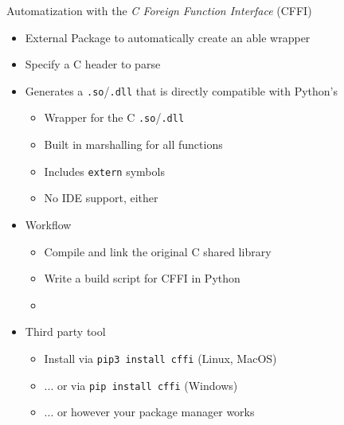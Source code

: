 
\begin{frame}{Automatization with the \emph{C Foreign Function Interface} (CFFI)}
%
\begin{itemize}
\item External Package to automatically create an able wrapper
\item Specify a C header to parse
\item Generates a \texttt{.so}/\texttt{.dll} that is directly compatible with Python's 
	\begin{itemize}
	\item Wrapper for the C \texttt{.so}/\texttt{.dll}
	\item Built in marshalling for all functions
	\item Includes \texttt{extern} symbols
	\item No IDE support, either
	\end{itemize}
\item Workflow
	\begin{itemize}
	\item Compile and link the original C shared library
	\item Write a build script for CFFI in Python
	\item {}
	\end{itemize}
\item Third party tool
	\begin{itemize}
	\item Install via \texttt{pip3 install cffi} (Linux, MacOS)
	\item ... or via \texttt{pip install cffi} (Windows)
	\item ... or however your package manager works
	\end{itemize}
\end{itemize}
%
\end{frame}


